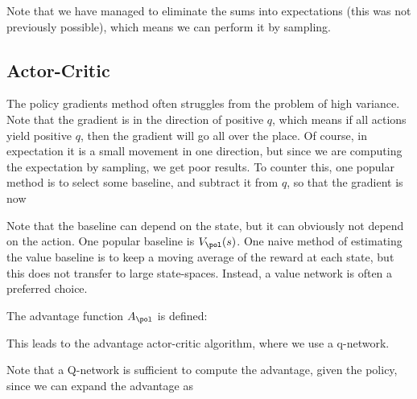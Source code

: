 \documentclass[12pt]{article}
\begin{document}
Note that we have managed to eliminate the sums into expectations (this was not previously possible), which means we can perform it by sampling.

\subsection{Actor-Critic}

The policy gradients method often struggles from the problem of high variance. Note that the gradient is in the direction of positive $q$, which means if all actions yield positive $q$, then the gradient will go all over the place. Of course, in expectation it is a small movement in one direction, but since we are computing the expectation by sampling, we get poor results. To counter this, one popular method is to select some baseline, and subtract it from $q$, so that the gradient is now


Note that the baseline can depend on the state, but it can obviously not depend on the action. One popular baseline is $V_{\pol}(s)$. One naive method of estimating the value baseline is to keep a moving average of the reward at each state, but this does not transfer to large state-spaces. Instead, a value network is often a preferred choice.

The advantage function $A_{\pol}$ is defined:


This leads to the advantage actor-critic algorithm, where we use a q-network.


Note that a Q-network is sufficient to compute the advantage, given the policy, since we can expand the advantage as

\end{document}
